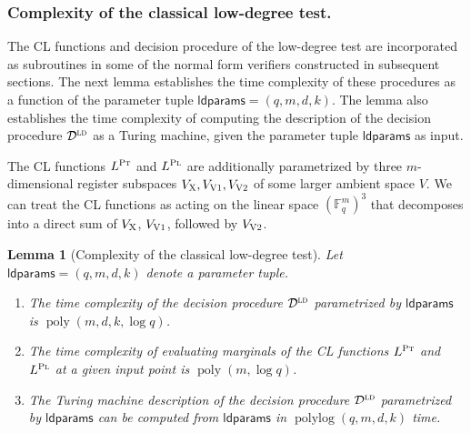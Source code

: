 \documentclass[11pt]{article}
\newtheorem{lemma}[theorem]{Lemma}
\theoremstyle{definition}
\newcommand{\F}{\ensuremath{\mathbb{F}}}
\newcommand{\ld}{\textsc{ld}}
\DeclareMathOperator{\poly}{poly}
\DeclareMathOperator{\polylog}{polylog}
\newcommand{\decider}{\mathcal{D}}
\newcommand{\labelstyle}[1]{\ensuremath{\textsc{#1}}\xspace}
\newcommand{\xpt}{\labelstyle{X}}
\newcommand{\dir}[1]{\labelstyle{V#1}}
\newcommand{\plf}{\labelstyle{Pl}}
\newcommand{\ptf}{\labelstyle{Pt}}
\newcommand{\ldparams}{\mathsf{ldparams}}
\newcommand{\tnote}[1]{}
\newcommand{\jnote}[1]{}
\begin{document}
\subsubsection{Complexity of the classical low-degree test.}
The CL functions and decision procedure of the low-degree test are incorporated
as subroutines in some of the normal form verifiers constructed in subsequent
sections.
The next lemma establishes the time complexity of these procedures as a function
of the parameter tuple $\ldparams = (q,m,d,k)$.
The lemma also establishes the time complexity of computing the {description} of
the decision procedure $\decider^\ld$ as a Turing machine, given the parameter
tuple $\ldparams$ as input.

The CL functions $L^\ptf$ and $L^\plf$ are additionally parametrized by three
$m$-dimensional register subspaces $V_\xpt, V_{\dir{1}}, V_{\dir{2}}$ of some
larger ambient space $V$.
We can treat the CL functions as acting on the linear space $(\F_q^m)^3$ that
decomposes into a direct sum of $V_\xpt$, $V_{\dir{1}}$, followed by
$V_{\dir{2}}$.

\begin{lemma}[Complexity of the classical low-degree test]
  \label{lem:ld-complexity}
  Let $\ldparams = (q,m,d,k)$ denote a parameter tuple.
  \begin{enumerate}
	\item The time complexity of the decision procedure $\decider^\ld$
    parametrized by $\ldparams$ is $\poly(m, d, k, \log q)$.
	\item The time complexity of evaluating marginals of the CL functions $L^\ptf$
    and $L^\plf$ at a given input point is $\poly(m, \log q)$.
	\item The Turing machine description of the decision procedure $\decider^\ld$
    parametrized by $\ldparams$ can be computed from $\ldparams$ in $\polylog
    (q,m,d,k)$ time.
  \end{enumerate}
\end{lemma}
\end{document}
